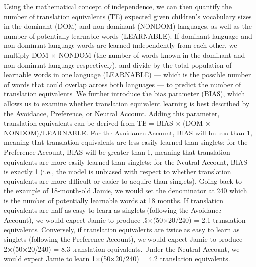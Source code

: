 \documentclass[
  english,
  ,man,floatsintext]{apa6}
\begin{document}
Using the mathematical concept of independence, we can then quantify the number of translation equivalents (TE) expected given children's vocabulary sizes in the dominant (DOM) and non-dominant (NONDOM) languages, as well as the number of potentially learnable words (LEARNABLE). If dominant-language and non-dominant-language words are learned independently from each other, we multiply DOM × NONDOM (the number of words known in the dominant and non-dominant language respectively), and divide by the total population of learnable words in one language (LEARNABLE) --- which is the possible number of words that could overlap across both languages --- to predict the number of translation equivalents. We further introduce the bias parameter (BIAS), which allows us to examine whether translation equivalent learning is best described by the Avoidance, Preference, or Neutral Account. Adding this parameter, translation equivalents can be derived from TE = BIAS × (DOM × NONDOM)/LEARNABLE. For the Avoidance Account, BIAS will be less than 1, meaning that translation equivalents are less easily learned than singlets; for the Preference Account, BIAS will be greater than 1, meaning that translation equivalents are more easily learned than singlets; for the Neutral Account, BIAS is exactly 1 (i.e., the model is unbiased with respect to whether translation equivalents are more difficult or easier to acquire than singlets). Going back to the example of 18-month-old Jamie, we would set the denominator at 240 which is the number of potentially learnable words at 18 months. If translation equivalents are half as easy to learn as singlets (following the Avoidance Account), we would expect Jamie to produce .5×(50×20/240) = 2.1 translation equivalents. Conversely, if translation equivalents are twice as easy to learn as singlets (following the Preference Account), we would expect Jamie to produce 2×(50×20/240) = 8.3 translation equivalents. Under the Neutral Account, we would expect Jamie to learn 1×(50×20/240) = 4.2 translation equivalents.
\end{document}
